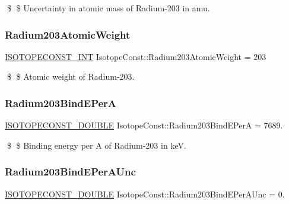 \$ \$ Uncertainty in atomic mass of Radium-\/203 in amu. \mbox{\label{group___isotope_const-_radium-_ra203_ga699b26893a7ca64596c13fb8e3b24e52}} 
\subsubsection{\texorpdfstring{Radium203\+Atomic\+Weight}{Radium203AtomicWeight}}
{\footnotesize\ttfamily \mbox{\hyperlink{group___isotope_const-_macros_ga5f18360b3e99483a35c32d789e62621c}{I\+S\+O\+T\+O\+P\+E\+C\+O\+N\+S\+T\+\_\+\+I\+NT}} Isotope\+Const\+::\+Radium203\+Atomic\+Weight = 203}

\$ \$ Atomic weight of Radium-\/203. \mbox{\label{group___isotope_const-_radium-_ra203_gada70641f84d1529d76d41cce6acb675b}} 
\subsubsection{\texorpdfstring{Radium203\+Bind\+E\+PerA}{Radium203BindEPerA}}
{\footnotesize\ttfamily \mbox{\hyperlink{group___isotope_const-_macros_ga8f45a7272ce02c0b4c65c44636ed719a}{I\+S\+O\+T\+O\+P\+E\+C\+O\+N\+S\+T\+\_\+\+D\+O\+U\+B\+LE}} Isotope\+Const\+::\+Radium203\+Bind\+E\+PerA = 7689.}

\$ \$ Binding energy per A of Radium-\/203 in keV. \mbox{\label{group___isotope_const-_radium-_ra203_ga3e1892ef2e0c8fafe263097045546651}} 
\subsubsection{\texorpdfstring{Radium203\+Bind\+E\+Per\+A\+Unc}{Radium203BindEPerAUnc}}
{\footnotesize\ttfamily \mbox{\hyperlink{group___isotope_const-_macros_ga8f45a7272ce02c0b4c65c44636ed719a}{I\+S\+O\+T\+O\+P\+E\+C\+O\+N\+S\+T\+\_\+\+D\+O\+U\+B\+LE}} Isotope\+Const\+::\+Radium203\+Bind\+E\+Per\+A\+Unc = 0.}

